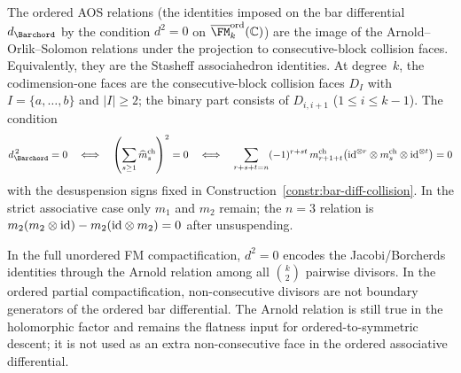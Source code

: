 \begin{theorem}
\ClaimStatusProvedHere
\label{thm:ordered-AOS}
The ordered AOS relations (the identities imposed on the bar
differential $d_{\Barchord}$ by the condition $d^2 = 0$
on $\overline{\FM}_k^{\mathrm{ord}}(\mathbb{C})$) are the image of
the Arnold--Orlik--Solomon relations under the projection to
consecutive-block collision faces. Equivalently, they are the
Stasheff associahedron identities. At degree~$k$, the
codimension-one faces are the consecutive-block collision faces
$D_I$ with $I=\{a,\dots,b\}$ and $|I|\ge2$; the binary part consists
of $D_{i,i+1}$ ($1 \leq i \leq k{-}1$).
The condition
\begin{equation}\label{eq:ordered-d-squared}
d_{\Barchord}^{\,2}=0
\quad\Longleftrightarrow\quad
\left(\sum_{s\ge1}\widehat m_s^{\mathrm{ch}}\right)^2=0
\quad\Longleftrightarrow\quad
\sum_{r+s+t=n}
(-1)^{r+st}\,
m_{r+1+t}^{\mathrm{ch}}
\bigl(\id^{\otimes r}\otimes m_s^{\mathrm{ch}}
\otimes\id^{\otimes t}\bigr)
=0
\end{equation}
with the desuspension signs fixed in
Construction~\ref{constr:bar-diff-collision}. In the strict
associative case only $m_1$ and $m_2$ remain; the $n=3$ relation is
$m_2(m_2\otimes\mathrm{id})-m_2(\mathrm{id}\otimes m_2)=0$ after unsuspending.

In the full unordered FM compactification, $d^2 = 0$ encodes the
Jacobi/Borcherds identities through the Arnold relation among all
$\binom{k}{2}$ pairwise divisors. In the ordered partial
compactification, non-consecutive divisors are not boundary generators
of the ordered bar differential. The Arnold relation is still true in
the holomorphic factor and remains the flatness input for
ordered-to-symmetric descent; it is not used as an extra
non-consecutive face in the ordered associative differential.
\end{theorem}

